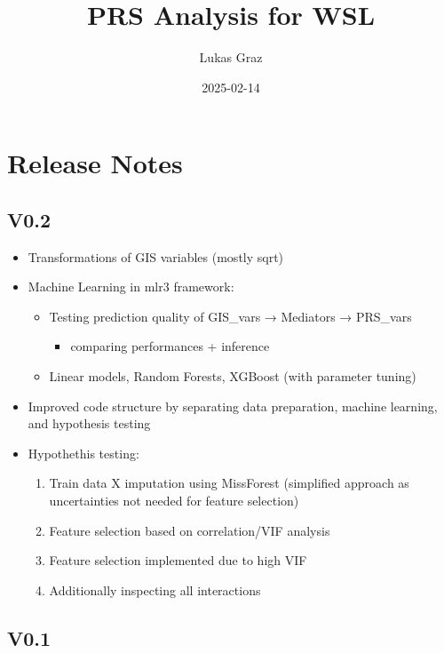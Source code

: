 \documentclass[
  letterpaper,
  DIV=11,
  numbers=noendperiod]{scrartcl}
\title{PRS Analysis for WSL}
\author{Lukas Graz}
\date{2025-02-14}
\providecommand{\tightlist}{%
  \setlength{\itemsep}{0pt}\setlength{\parskip}{0pt}}\usepackage{longtable,booktabs,array}
\begin{document}
\maketitle


\section{Release Notes}\label{release-notes}

\subsection{V0.2}\label{v0.2}

\begin{itemize}
\tightlist
\item
  Transformations of GIS variables (mostly sqrt)
\item
  Machine Learning in mlr3 framework:

  \begin{itemize}
  \tightlist
  \item
    Testing prediction quality of GIS\_vars → Mediators → PRS\_vars

    \begin{itemize}
    \tightlist
    \item
      comparing performances + inference
    \end{itemize}
  \item
    Linear models, Random Forests, XGBoost (with parameter tuning)
  \end{itemize}
\item
  Improved code structure by separating data preparation, machine
  learning, and hypothesis testing
\item
  Hypothethis testing:

  \begin{enumerate}
  \def\labelenumi{\arabic{enumi}.}
  \tightlist
  \item
    Train data X imputation using MissForest (simplified approach as
    uncertainties not needed for feature selection)
  \item
    Feature selection based on correlation/VIF analysis
  \item
    Feature selection implemented due to high VIF
  \item
    Additionally inspecting all interactions
  \end{enumerate}
\end{itemize}

\subsection{V0.1}\label{v0.1}
\end{document}
